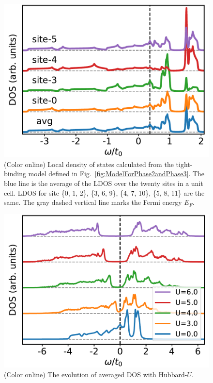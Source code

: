 \documentclass[aps,prb,amsfonts,amsmath,amssymb,showpacs,groupedaddress,superscriptaddress]{revtex4-1}
\begin{document}
\begin{figure}[p]
    \includegraphics[width=0.8\columnwidth]{fig/TBAForPhase2AndPhase3.pdf}
    \caption{\label{fig:TBAForPhase2AndPhase3} (Color online) Local density of states calculated from the tight-binding model defined in Fig.~\ref{fig:ModelForPhase2andPhase3}. The blue line is the average of the LDOS over the twenty sites in a unit cell. LDOS for site \{0, 1, 2\}, \{3, 6, 9\}, \{4, 7, 10\}, \{5, 8, 11\} are the same. The gray dashed vertical line marks the Fermi energy $E_{F}$.}
\end{figure}

\begin{figure}[p]
    \includegraphics[width=0.8\columnwidth]{fig/CPTForPhase2andPhase3.pdf}
    \caption{\label{fig:CPTForPhase2andPhase3} (Color online) The evolution of averaged DOS with Hubbard-$U$.}
\end{figure}
\end{document}
